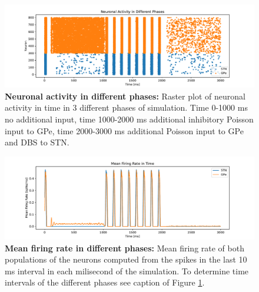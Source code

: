 \documentclass[11pt]{article}
\begin{document}
\begin{figure}[tb]
    \centering
    \includegraphics[width=\textwidth]{images/raster_spikes.pdf}
    \caption{\textbf{Neuronal activity in different phases:} 
    Raster plot of neuronal activity in time in 3 different phases of 
    simulation. Time 0-1000 ms no additional input, time 1000-2000 ms additional 
    inhibitory Poisson input to GPe, time 2000-3000 ms additional Poisson input 
    to GPe and DBS to STN.}
    \label{fig:raster_plot}
\end{figure}

\begin{figure}[tb]
    \centering
    \includegraphics[width=\textwidth]{images/mean_firing_rate.pdf}
    \caption{\textbf{Mean firing rate in different phases:} 
    Mean firing rate of both populations of the neurons computed 
    from the spikes in the last 10 ms interval in each milisecond of the simulation.
    To determine time intervals of the different phases see caption of Figure
    \ref{fig:raster_plot}.}
    \label{fig:firing_rate}
\end{figure}
\end{document}
